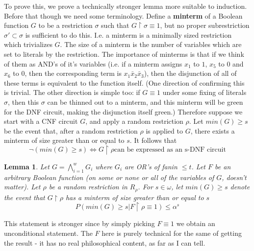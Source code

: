\documentclass{article}
\theoremstyle{definition}
\theoremstyle{plain}
\theoremstyle{theorem}
\newtheorem{lemma}{Lemma}[section]
\begin{document}
To prove this, we prove a technically stronger lemma more suitable to induction. Before that though we need some terminology. Define a \textbf{minterm} of a Boolean function $G$ to be a restriction $\sigma$ such that $G \restriction \sigma \equiv 1$, but no proper subrestriction $\sigma' \subset \sigma$ is sufficient to do this. I.e. a minterm is a minimally sized restriction which trivializes $G$. The size of a minterm is the number of variables which are set to literals by the restriction. The importance of minterms is that if we think of them as AND's of it's variables (i.e. if a minterm assigns $x_1$ to $1$, $x_5$ to $0$ and $x_6$ to $0$, then the corresponding term is $x_1\bar{x}_2\bar{x}_3$), then the disjunction of all of these terms is equivalent to the function itself. (One direction of confirming this is trivial. The other direction is simple too: if $G \equiv 1$ under some fixing of literals $\sigma$, then this $\sigma$ can be thinned out to a minterm, and this minterm will be green for the DNF circuit, making the disjunction itself green.) Therefore suppose we start with a CNF circuit $G$, and apply a random restriction $\rho$. Let $min(G) \geq s$ be the event that, after a random restriction $\rho$ is applied to $G$, there exists a minterm of size greater than or equal to $s$. It follows that 
\[ \neg (min(G) \geq s) \iff G \restriction \rho \textrm{can be expressed as an s-DNF circuit}  \] 
\begin{lemma}
	Let $G = \bigwedge_{i=1}^wG_i$ where $G_i$ are OR's of fanin $\leq t$. Let $F$ be an arbitrary Boolean function (on some or none or all of the variables of $G$, doesn't matter). Let $\rho$ be a random restriction in $R_{\rho}$. For $s \in \omega$, let $min(G) \geq s$ denote the event that $G\restriction \rho$ has a minterm of size greater than or equal to $s$
	\[ P(min(G)\geq s|F \restriction \rho \equiv 1) \leq \alpha^s  \]
\end{lemma}
This statement is stronger since by simply picking $F \equiv 1$ we obtain an unconditional statement. The $F$ here is purely technical for the same of getting the result - it has no real philosophical content, as far as I can tell. 
\end{document}
